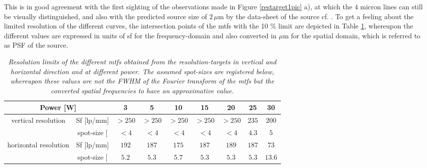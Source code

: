 This is in good agreement with the first sighting of the observations made in Figure \ref{restarget1pic} a), at which the $4$ micron lines can still be visually distinguished, and also with the predicted source size of $2\, \mu$m by the data-sheet of the source cf. \citep{DatasheetX}. To get a feeling about the limited resolution of the different curves, the intersection points of the \glspl{mtf} with the 10 \% limit are depicted in Table \ref{table:reslimit}, whereupon the different values are expressed in units of \acrfull{sf} for the frequency-domain and also converted in $\mu$m for the spatial domain, which is referred to as PSF of the source.
\vspace{0.5cm}
\begin{table}[h] 
	\begin{center}	
		\begin{tabular}{c|c||c|c|c|c|c|c|c}
			\multicolumn{2}{c||}{Power [W]}	& 3& 5& 10& 15& 20& 25& 30\\ \hline \hline
			\multirow{2}{18 mm}{vertical resolution}\rule{0pt}{13pt} & Sf [lp/mm] & $>250$ & $>250$ & $>250$ & $>250$ & $>250$ & $ 235$& $200$ \\ \cline{2-9}
			\rule{0pt}{13pt} & spot-size [\text{$\mu$m]} & $<4$& $<4$ & $<4$ &$<4$& $<4$& $4.3$&$5$ \\ \hline
			\multirow{2}{18 mm}{horizontal resolution}\rule{0pt}{13pt} & Sf [lp/mm] & $ 192$ & $187$ &$175$ &$187$ &$189$ &$187$ &$73$ \\ \cline{2-9}
			\rule{0pt}{13pt} & spot-size [\text{$\mu$m]} &$5.2$ &$5.3$ &$5.7$ &$5.3$ &$5.3$ &$5.3$ &$13.6$  \\  	  
		\end{tabular}
		\caption[Resolution limits and correlated assumed spot-sizes]{\textit{Resolution limits of the different \glspl{mtf} obtained from the resolution-targets in vertical and horizontal direction and at different power. The assumed spot-sizes are registered below, whereupon these values are not the FWHM of the Fourier transform of the \glspl{mtf} but the converted spatial frequencies to have an approximative value.}}
		\label{table:reslimit}
	\end{center}    
\end{table}
